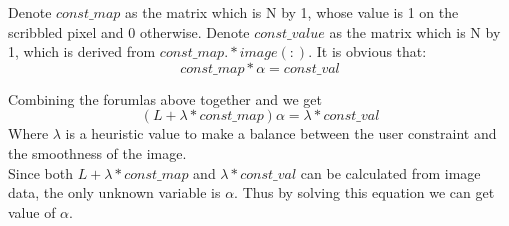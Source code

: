 \documentclass[11pt,letterpaper]{article}
\begin{document}
Denote $const\_map$ as the matrix which is N by 1, whose value is 1 on the scribbled pixel and 0 otherwise. Denote $const\_value$ as the matrix which is N by 1, which is derived from $const\_map .* image(:)$. It is obvious that:
$$const\_map * \alpha = const\_val$$

Combining the forumlas above together and we get
$$(L + \lambda * const\_map)\alpha = \lambda * const\_val$$
Where $\lambda$ is a heuristic value to make a balance between the user constraint and the smoothness of the image.\\

Since both $L + \lambda * const\_map$ and $\lambda * const\_val$ can be calculated from image data, the only unknown variable is $\alpha$. Thus by solving this equation we can get value of $\alpha$.


\end{document}
